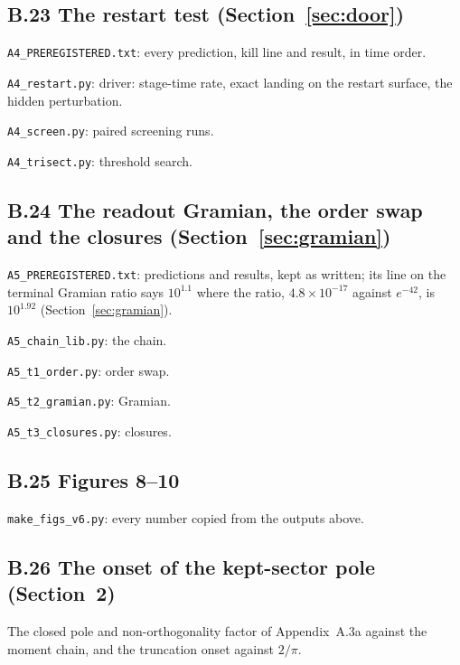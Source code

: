 \subsection*{B.23 The restart test (Section~\ref{sec:door})}
\noindent\texttt{A4\_PREREGISTERED.txt}: every prediction, kill line and result, in time order.

\noindent\texttt{A4\_restart.py}: driver: stage-time rate, exact landing on the restart surface, the hidden perturbation.

\noindent\texttt{A4\_screen.py}: paired screening runs.

\noindent\texttt{A4\_trisect.py}: threshold search.

\subsection*{B.24 The readout Gramian, the order swap and the closures (Section~\ref{sec:gramian})}
\noindent\texttt{A5\_PREREGISTERED.txt}: predictions and results, kept as written; its line on the terminal Gramian ratio says $10^{1.1}$ where the ratio, $4.8\times10^{-17}$ against $e^{-42}$, is $10^{1.92}$ (Section~\ref{sec:gramian}).

\noindent\texttt{A5\_chain\_lib.py}: the chain.

\noindent\texttt{A5\_t1\_order.py}: order swap.

\noindent\texttt{A5\_t2\_gramian.py}: Gramian.

\noindent\texttt{A5\_t3\_closures.py}: closures.

\subsection*{B.25 Figures 8--10}
\noindent\texttt{make\_figs\_v6.py}: every number copied from the outputs above.

\subsection*{B.26 The onset of the kept-sector pole (Section~2)}
The closed pole and non-orthogonality factor of Appendix~A.3a against the moment chain, and the truncation onset against $2/\pi$.



